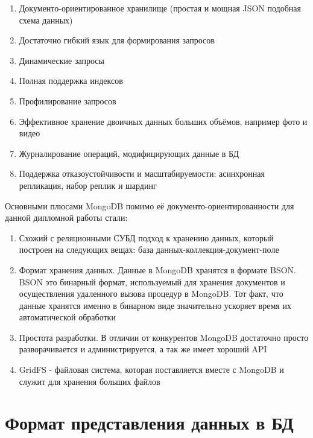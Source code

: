 \documentclass[14pt]{extreport}
\begin{document}
\begin{enumerate}

\item Документо-ориентированное хранилище (простая и мощная JSON подобная схема данных)
\item Достаточно гибкий язык для формирования запросов
\item Динамические запросы
\item Полная поддержка индексов
\item Профилирование запросов
\item Эффективное хранение двоичных данных больших объёмов, например фото и видео
\item Журналирование операций, модифицирующих данные в БД
\item Поддержка отказоустойчивости и масштабируемости: асинхронная репликация, набор реплик и шардинг

\end{enumerate}

Основными плюсами MongoDB помимо её документо-ориентированности для данной дипломной работы стали:

\begin{enumerate}

\item Схожий с реляционными СУБД подход к хранению данных, который построен на следующих вещах: база данных-коллекция-документ-поле

\item Формат хранения данных. Данные в MongoDB хранятся в формате BSON. BSON это бинарный формат, используемый для хранения документов и осуществления удаленного вызова процедур в MongoDB. Тот факт, что данные хранятся именно в бинарном виде значительно ускоряет время их автоматической обработки

\item Простота разработки. В отличии от конкурентов MongoDB достаточно просто разворачивается и администрируется, а так же имеет хороший API 

\item GridFS - файловая система, которая поставляется вместе с MongoDB и служит для хранения больших файлов

\end{enumerate}


\section{Формат представления данных в БД}
\end{document}
